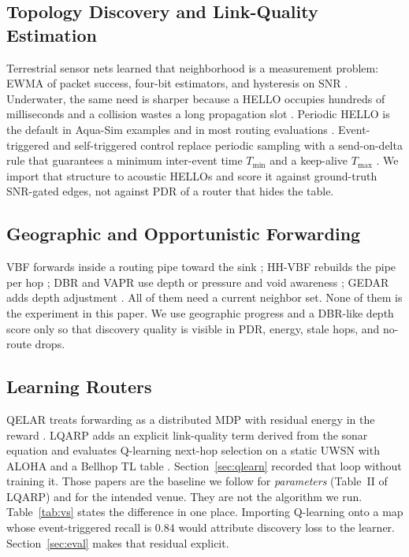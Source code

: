 \documentclass[journal]{IEEEtran}
\begin{document}
\subsection{Topology Discovery and Link-Quality Estimation}
Terrestrial sensor nets learned that neighborhood is a measurement
problem: EWMA of packet success, four-bit estimators, and hysteresis
on SNR \cite{woo2003taming,fonseca2007fourbit}. Underwater, the same
need is sharper because a HELLO occupies hundreds of milliseconds and
a collision wastes a long propagation slot
\cite{casari2011protocol,chitre2008uwa,akyildiz2007state}.
Periodic HELLO is the default in Aqua-Sim examples and in most routing
evaluations \cite{xie2009aquasim}. Event-triggered and self-triggered
control replace periodic sampling with a send-on-delta rule that
guarantees a minimum inter-event time $T_{\min}$ and a keep-alive
$T_{\max}$ \cite{tabuada2007event,heemels2012event}.
We import that structure to acoustic HELLOs and score it against
ground-truth SNR-gated edges, not against PDR of a router that hides
the table.

\subsection{Geographic and Opportunistic Forwarding}
VBF forwards inside a routing pipe toward the sink \cite{xie2006vbf};
HH-VBF rebuilds the pipe per hop \cite{nicolaou2007hhvbf};
DBR and VAPR use depth or pressure and void awareness
\cite{yan2008dbr,noh2013vapr};
GEDAR adds depth adjustment \cite{coutinho2014gedar}.
All of them need a current neighbor set. None of them is the
experiment in this paper. We use geographic progress and a DBR-like
depth score only so that discovery quality is visible in PDR, energy,
stale hops, and no-route drops.

\subsection{Learning Routers}
QELAR treats forwarding as a distributed MDP with residual energy in
the reward \cite{hu2010qelar}. LQARP adds an explicit link-quality
term derived from the sonar equation and evaluates Q-learning next-hop
selection on a static UWSN with ALOHA and a Bellhop TL table
\cite{liu2026lqarp}.
Section~\ref{sec:qlearn} recorded that loop without training it.
Those papers are the baseline we follow for
\emph{parameters} (Table~II of LQARP) and for the intended venue.
They are not the algorithm we run. Table~\ref{tab:vs} states the
difference in one place. Importing Q-learning onto a map
whose event-triggered recall is $0.84$ would attribute discovery loss
to the learner. Section~\ref{sec:eval} makes that residual explicit.
\end{document}
